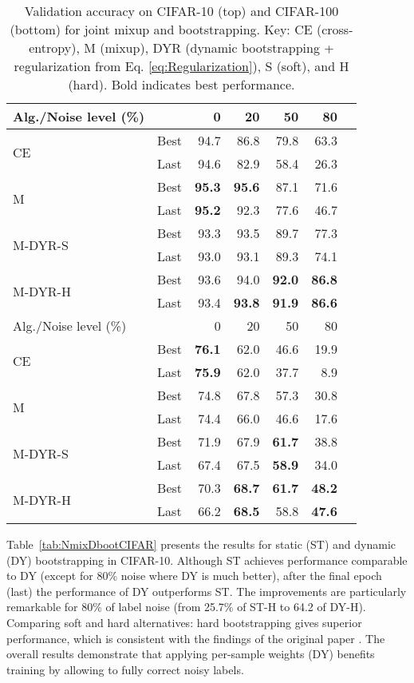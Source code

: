 \documentclass{article}
\providecommand{\tabularnewline}{\\}
\begin{document}
\begin{table}[t]
\begin{centering}
\caption{\label{tab:JointPerformance}Validation accuracy on CIFAR-10 (top) and CIFAR-100
(bottom) for joint mixup and bootstrapping. Key: CE (cross-entropy), M (mixup), DYR (dynamic bootstrapping + regularization from
Eq. \ref{eq:Regularization}), S (soft), and H (hard). Bold indicates
best performance.}
\vskip 0.15in 
\par\end{centering}
\begin{centering}
\begin{small}\begin{tabular}{llrrrrr}
\toprule 
Alg./Noise level (\%) &  & 0 & 20 & 50 & 80\tabularnewline
\midrule 
\multirow{2}{*}{CE} & Best & 94.7 & 86.8 & 79.8 & 63.3\tabularnewline
 & Last & 94.6 & 82.9 & 58.4 & 26.3\tabularnewline
\midrule 
\multirow{2}{*}{M \cite{2018_ICLR_mixup}} & Best & \textbf{95.3} & \textbf{95.6} & 87.1 & 71.6\tabularnewline
 & Last & \textbf{95.2} & 92.3 & 77.6 & 46.7\tabularnewline
\midrule 
\multirow{2}{*}{M-DYR-S} & Best & 93.3 & 93.5 & 89.7 & 77.3\tabularnewline
 & Last & 93.0 & 93.1 & 89.3 & 74.1\tabularnewline
\midrule 
\multirow{2}{*}{M-DYR-H} & Best & 93.6 & 94.0 & \textbf{92.0} & \textbf{86.8}\tabularnewline
 & Last & 93.4 & \textbf{93.8} & \textbf{91.9} & \textbf{86.6}\tabularnewline
\bottomrule 
\toprule 
Alg./Noise level (\%) &  & 0 & 20 & 50 & 80\tabularnewline
\midrule 
\multirow{2}{*}{CE} & Best & \textbf{76.1} & 62.0 & 46.6 & 19.9\tabularnewline
 & Last & \textbf{75.9} & 62.0 & 37.7 & 8.9\tabularnewline
\midrule 
\multirow{2}{*}{M \cite{2018_ICLR_mixup}} & Best & 74.8 & 67.8 & 57.3 & 30.8\tabularnewline
 & Last & 74.4 & 66.0 & 46.6 & 17.6\tabularnewline
\midrule 
\multirow{2}{*}{M-DYR-S} & Best & 71.9 & 67.9 & \textbf{61.7} & 38.8\tabularnewline
 & Last & 67.4 & 67.5 & \textbf{58.9} & 34.0\tabularnewline
\midrule 
\multirow{2}{*}{M-DYR-H} & Best & 70.3 & \textbf{68.7} & \textbf{61.7} & \textbf{48.2}\tabularnewline
 & Last & 66.2 & \textbf{68.5} & 58.8 & \textbf{47.6}\tabularnewline
\bottomrule 
\end{tabular}\end{small}
\par\end{centering}
\centering{}\vskip -0.1in 
\end{table}
Table~\ref{tab:NmixDbootCIFAR} presents the results for static (ST) and
dynamic (DY) bootstrapping in CIFAR-10. Although ST achieves performance comparable to DY (except for 80\% noise where DY is much better), after the final epoch (last) the performance of DY outperforms ST. The improvements are particularly remarkable for 80\% of label noise (from 25.7\% of ST-H to 64.2 of DY-H). Comparing soft and hard alternatives: hard bootstrapping gives superior performance, which is consistent with the findings of the original paper \cite{2015_ICLR_Bootstrapping}. The overall results demonstrate that applying per-sample weights (DY) benefits training by allowing to fully correct noisy labels.
\end{document}
